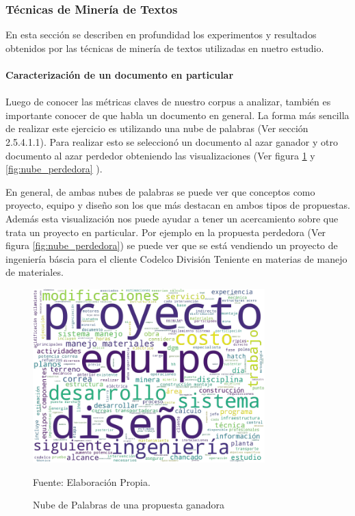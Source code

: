 \subsubsection{Técnicas de Minería de Textos}
    En esta sección se describen en profundidad los experimentos y resultados obtenidos por las técnicas de minería de textos utilizadas en nuetro estudio. 
    
\paragraph{Caracterización de un documento en particular}
\paragraph*{}
    Luego de conocer las métricas claves de nuestro corpus a analizar, también es importante conocer de que habla un documento en general. La forma más sencilla de realizar este ejercicio es utilizando una nube de palabras (Ver sección 2.5.4.1.1). Para realizar esto se seleccionó un documento al azar ganador y otro documento al azar perdedor obteniendo las visualizaciones (Ver figura \ref{fig:nube_ganadora} y \ref{fig:nube_perdedora} ). 
    
    En general, de ambas nubes de palabras se puede ver que conceptos como proyecto, equipo y diseño son los que más destacan en ambos tipos de propuestas. Además esta visualización nos puede ayudar a tener un acercamiento sobre que trata un proyecto en particular. Por ejemplo en la propuesta perdedora (Ver figura \ref{fig:nube_perdedora}) se puede ver que se está vendiendo un proyecto de ingeniería báscia para el cliente Codelco División Teniente en materias de manejo de materiales. 

\begin{figure}[H]
\centering
\includegraphics[width=0.8\textwidth]{figures/KeyWords/nube_ganadora.png}
\caption{\label{fig:nube_ganadora} Nube de Palabras de una propuesta ganadora} Fuente: Elaboración Propia.
\end{figure}

